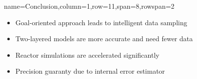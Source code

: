 \documentclass[
	accentcolor=3c,
	boxstyle=colored, %
	colorback=false,
	title=small
	]{tudasciposter}
\begin{document}
\begin{tcbposter}[
	poster={
		columns=8,
		rows=12,
		spacing=1cm,
	},]
\begin{posterboxenv}[title=4. Conclusion]{name=Conclusion,column=1,row=11,span=8,rowspan=2}
\begin{multicols}{2}		
	\begin{itemize}
		\item Goal-oriented approach leads to intelligent data sampling
		\item Two-layered models are more accurate and need fewer data
		\item Reactor simulations are accelerated significantly
		\item Precision guaranty due to internal error estimator
	\end{itemize}
\end{multicols}

\end{posterboxenv}

\end{tcbposter}
\end{document}
